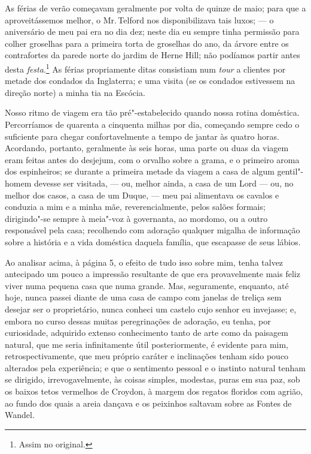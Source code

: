 As férias de verão começavam geralmente por volta de quinze de maio;
para que a aproveitássemos melhor, o Mr.\,Telford nos disponibilizava tais
luxos; --- o aniversário de meu pai era no dia dez; neste dia eu sempre
tinha permissão para colher groselhas para a primeira torta de groselhas
do ano, da árvore entre os contrafortes da parede norte do jardim de
Herne Hill; não podíamos partir antes desta \textit{festa}.\footnote{Assim
  no original.} As férias propriamente ditas
consistiam num \textit{tour} a clientes por metade dos condados da
Inglaterra; e uma visita (se os condados estivessem na direção norte) a
minha tia na Escócia.

Nosso ritmo de viagem era tão pré"-estabelecido quando nossa rotina
doméstica. Percorríamos de quarenta a cinquenta milhas por dia,
começando sempre cedo o suficiente para chegar confortavelmente a tempo
de jantar às quatro horas. Acordando, portanto, geralmente às seis
horas, uma parte ou duas da viagem eram feitas antes do desjejum, com o
orvalho sobre a grama, e o primeiro aroma dos espinheiros; se durante a
primeira metade da viagem a casa de algum gentil"-homem devesse ser
visitada, --- ou, melhor ainda, a casa de um Lord --- ou, no melhor dos
casos, a casa de um Duque, --- meu pai alimentava os cavalos e conduzia a
mim e a minha mãe, reverencialmente, pelos salões formais; dirigindo"-se
sempre à meia"-voz à governanta, ao mordomo, ou a outro responsável pela
casa; recolhendo com adoração qualquer migalha de informação sobre a
história e a vida doméstica daquela família, que escapasse de seus
lábios.

Ao analisar acima, à página 5, o efeito de tudo isso sobre mim,
tenha talvez antecipado um pouco a impressão resultante de que era
provavelmente mais feliz viver numa pequena casa que numa grande. Mas,
seguramente, enquanto, até hoje, nunca passei diante de uma casa de
campo com janelas de treliça sem desejar ser o proprietário, nunca
conheci um castelo cujo senhor eu invejasse; e, embora no curso dessas
muitas peregrinações de adoração, eu tenha, por curiosidade, adquirido
extenso conhecimento tanto de arte como da paisagem natural, que me
seria infinitamente útil posteriormente, é evidente para mim,
retrospectivamente, que meu próprio caráter e inclinações tenham sido
pouco alterados pela experiência; e que o sentimento pessoal e o
instinto natural tenham se dirigido, irrevogavelmente, às coisas
simples, modestas, puras em sua paz, sob os baixos tetos vermelhos de
Croydon, à margem dos regatos floridos com agrião, ao fundo dos quais a
areia dançava e os peixinhos saltavam sobre as Fontes de Wandel.

